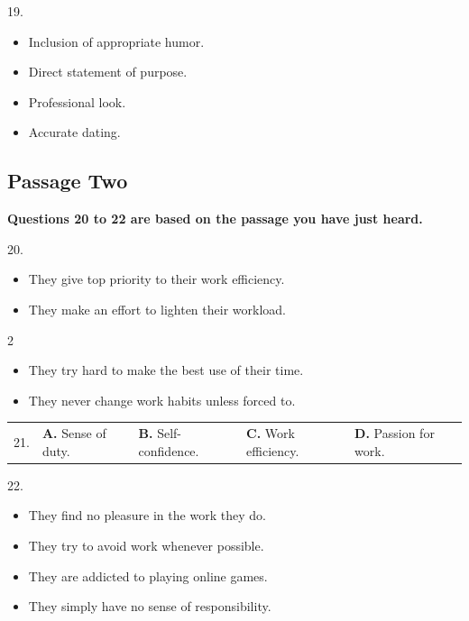 \documentclass[UTF8,11pt]{ctexart}
\begin{document}
19.


\begin{itemize}[leftmargin=2em,itemsep=.2em,topsep=.4em]\item[A.] Inclusion of appropriate humor.
\item[B.] Direct statement of purpose.
\item[C.] Professional look.
\item[D.] Accurate dating.
\end{itemize}

\subsection*{\textbf{Passage Two}}


\textbf{Questions 20 to 22 are based on the passage you have just heard.}


20.


\begin{itemize}[leftmargin=2em,itemsep=.2em,topsep=.4em]\item[A.] They give top priority to their work efficiency.
\item[B.] They make an effort to lighten their workload.
\end{itemize}

2


\begin{itemize}[leftmargin=2em,itemsep=.2em,topsep=.4em]\item[C.] They try hard to make the best use of their time.
\item[D.] They never change work habits unless forced to.
\end{itemize}

\noindent\begin{tabularx}{\linewidth}{@{}lXXXX@{}}21. & \textbf{A.} Sense of duty. & \textbf{B.} Self-confidence. & \textbf{C.} Work efficiency. & \textbf{D.} Passion for work.\\\end{tabularx}\par

22.


\begin{itemize}[leftmargin=2em,itemsep=.2em,topsep=.4em]\item[A.] They find no pleasure in the work they do.
\item[B.] They try to avoid work whenever possible.
\item[C.] They are addicted to playing online games.
\item[D.] They simply have no sense of responsibility.
\end{itemize}
\end{document}
